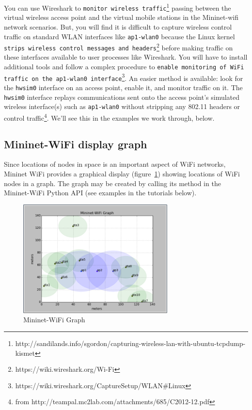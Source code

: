 You can use Wireshark to \texttt{monitor wireless traffic}\footnote{http://sandilands.info/sgordon/capturing-wireless-lan-with-ubuntu-tcpdump-kismet} passing between the virtual wireless access point and the virtual mobile stations in the Mininet-wifi network scenarios. But, you will find it is difficult to capture wireless control traffic on standard WLAN interfaces like \texttt{ap1-wlan0} because the Linux kernel \texttt{strips wireless control messages and headers}\footnote{https://wiki.wireshark.org/Wi-Fi} before making traffic on these interfaces available to user processes like Wireshark. You will have to install additional tools and follow a complex procedure to \texttt{enable monitoring of WiFi traffic on the \texttt{ap1-wlan0} interface}\footnote{https://wiki.wireshark.org/CaptureSetup/WLAN\#Linux}. An easier method is available: look for the \texttt{hwsim0} interface on an access point, enable it, and monitor traffic on it. The \texttt{hwsim0} interface replays communications sent onto the access point's simulated wireless interface(s) such as \texttt{ap1-wlan0} without stripping any 802.11 headers or control traffic\footnote{from http://teampal.mc2lab.com/attachments/685/C2012-12.pdf}. We'll see this in the examples we work through, below.

\subsection{Mininet-WiFi display graph}

Since locations of nodes in space is an important aspect of WiFi networks, Mininet WiFi provides a graphical display (figure~\ref{fig:mngraph}) showing locations of WiFi nodes in a graph. The graph may be created by calling its method in the Mininet-WiFi Python API (see examples in the tutorials below).

\begin{figure}
    \centering
    \includegraphics[width=0.7\textwidth]{Pictures/mn-wifi-graph-200}
    \caption{Mininet-WiFi Graph}
    \label{fig:mngraph}
\end{figure}

